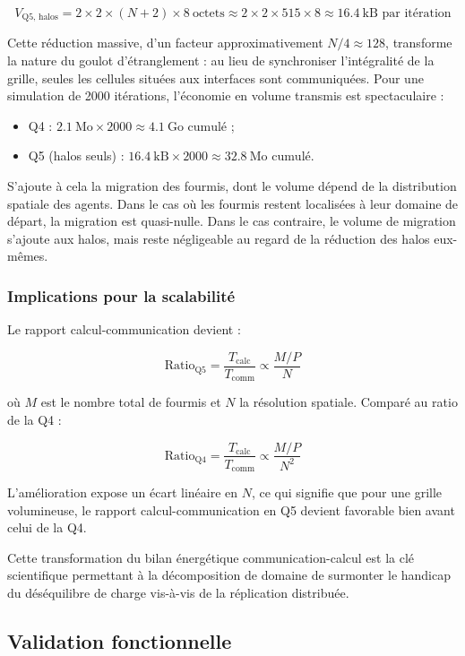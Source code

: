 \documentclass[11pt,a4paper]{article}
\begin{document}
\[
V_{\text{Q5, halos}} = 2 \times 2 \times (N + 2) \times 8\ \text{octets} \approx 2 \times 2 \times 515 \times 8 \approx 16.4\ \text{kB par itération}
\]

Cette réduction massive, d'un facteur approximativement $N / 4 \approx 128$, transforme la nature du goulot d'étranglement : au lieu de synchroniser l'intégralité de la grille, seules les cellules situées aux interfaces sont communiquées. Pour une simulation de 2000 itérations, l'économie en volume transmis est spectaculaire :

\begin{itemize}[leftmargin=1.2em]
  \item Q4 : $2.1\ \text{Mo} \times 2000 \approx 4.1\ \text{Go cumulé}$ ;
  \item Q5 (halos seuls) : $16.4\ \text{kB} \times 2000 \approx 32.8\ \text{Mo cumulé}$.
\end{itemize}

S'ajoute à cela la migration des fourmis, dont le volume dépend de la distribution spatiale des agents. Dans le cas où les fourmis restent localisées à leur domaine de départ, la migration est quasi-nulle. Dans le cas contraire, le volume de migration s'ajoute aux halos, mais reste négligeable au regard de la réduction des halos eux-mêmes.

\subsubsection{Implications pour la scalabilité}

Le rapport calcul-communication devient :

\[
\text{Ratio}_{\text{Q5}} = \frac{T_{\text{calc}}}{T_{\text{comm}}} \propto \frac{M / P}{N}
\]

où $M$ est le nombre total de fourmis et $N$ la résolution spatiale. Comparé au ratio de la Q4 :

\[
\text{Ratio}_{\text{Q4}} = \frac{T_{\text{calc}}}{T_{\text{comm}}} \propto \frac{M / P}{N^2}
\]

L'amélioration expose un écart linéaire en $N$, ce qui signifie que pour une grille volumineuse, le rapport calcul-communication en Q5 devient favorable bien avant celui de la Q4.

Cette transformation du bilan énergétique communication-calcul est la clé scientifique permettant à la décomposition de domaine de surmonter le handicap du déséquilibre de charge vis-à-vis de la réplication distribuée.

\subsection{Validation fonctionnelle}
\end{document}
